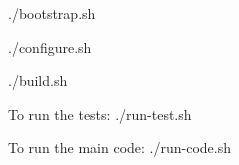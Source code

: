 
\begin{DoxyEnumerate}
\item ./bootstrap.sh
\item ./configure.sh
\item ./build.sh
\end{DoxyEnumerate}

To run the tests\+: ./run-\/test.sh

To run the main code\+: ./run-\/code.sh 